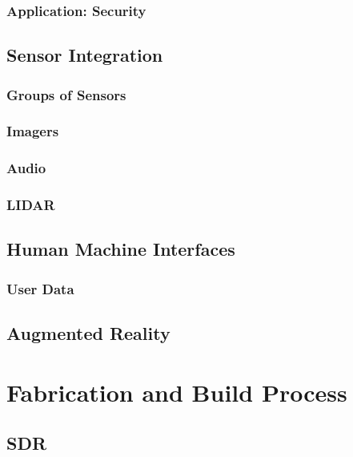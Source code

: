 \subsubsection{Application: Security}

\subsection{Sensor Integration}

\subsubsection{Groups of Sensors}

\subsubsection{Imagers}

\subsubsection{Audio}

\subsubsection{LIDAR}

\subsection{Human Machine Interfaces}

\subsubsection{User Data}

\subsection{Augmented Reality}


\section{Fabrication and Build Process}

\subsection{SDR}

